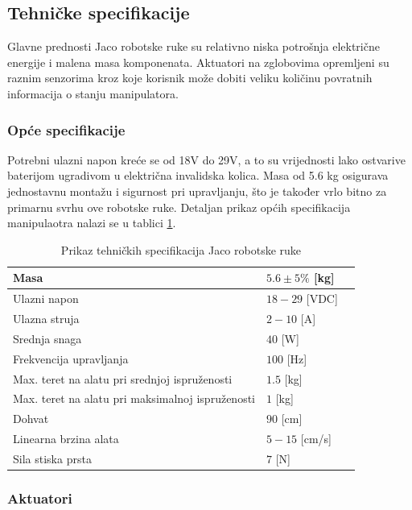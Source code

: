 \documentclass[times, utf8, diplomski, numeric]{fer}
\begin{document}
\subsection{Tehničke specifikacije}
Glavne prednosti Jaco robotske ruke su relativno niska potrošnja električne energije i malena masa komponenata.
Aktuatori na zglobovima opremljeni su raznim senzorima kroz koje korisnik može dobiti veliku količinu povratnih informacija o stanju manipulatora.


\subsubsection{Opće specifikacije}
Potrebni ulazni napon kreće se od 18V do 29V,  a to su vrijednosti lako ostvarive baterijom ugradivom u električna invalidska kolica.
Masa od 5.6 kg osigurava jednostavnu montažu i sigurnost pri upravljanju, što je također vrlo bitno za primarnu svrhu ove robotske ruke.
Detaljan prikaz općih specifikacija manipulaotra nalazi se u tablici \ref{jaco_spec}.

\begin{table}[h!]
    \centering
    \begin{tabular}{ | l | l | l |}
    \hline
    Masa & $5.6 \pm 5\%$ [kg] \\ \hline
    Ulazni napon  & $18 - 29$ [VDC] \\ \hline
    Ulazna struja & $2 - 10$ [A] \\ \hline
    Srednja snaga & $40$ [W] \\ \hline
    Frekvencija upravljanja & $100$ [Hz] \\ \hline
    Max. teret na alatu pri srednjoj ispruženosti & $1.5$  [kg]  \\ \hline
    Max. teret na alatu pri maksimalnoj ispruženosti  & $1$ [kg]\\ \hline
    Dohvat & $90$  [cm] \\ \hline
    Linearna brzina alata & $5 - 15$ [cm/s]\\ \hline
    Sila stiska prsta & $7$ [N] \\ \hline
    \end{tabular}
    \caption{Prikaz tehničkih specifikacija Jaco robotske ruke} \label{jaco_spec}
\end{table}

\subsubsection{Aktuatori}
\end{document}
